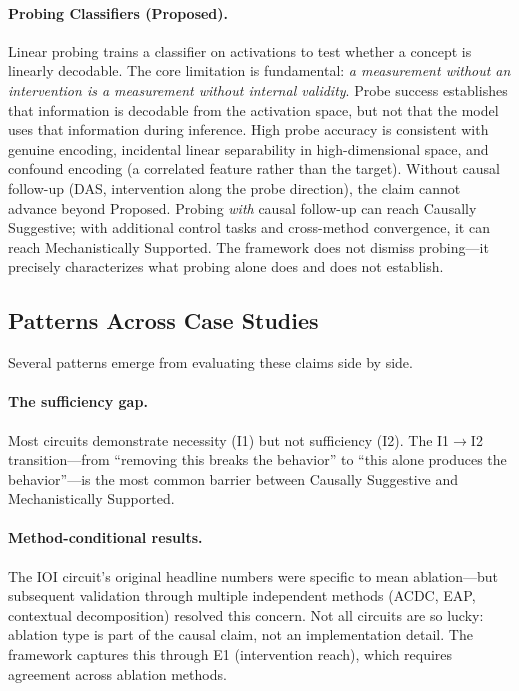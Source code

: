 \documentclass[10pt]{article}
\begin{document}
\paragraph{Probing Classifiers (Proposed).} Linear probing \citep{belinkov2022probing} trains a classifier on activations to test whether a concept is linearly decodable. The core limitation is fundamental: \emph{a measurement without an intervention is a measurement without internal validity}. Probe success establishes that information is decodable from the activation space, but not that the model uses that information during inference. High probe accuracy is consistent with genuine encoding, incidental linear separability in high-dimensional space, and confound encoding (a correlated feature rather than the target). Without causal follow-up (DAS, intervention along the probe direction), the claim cannot advance beyond Proposed. Probing \emph{with} causal follow-up can reach Causally Suggestive; with additional control tasks and cross-method convergence, it can reach Mechanistically Supported. The framework does not dismiss probing---it precisely characterizes what probing alone does and does not establish.

\subsection{Patterns Across Case Studies}

Several patterns emerge from evaluating these claims side by side.

\paragraph{The sufficiency gap.} Most circuits demonstrate necessity (I1) but not sufficiency (I2). The I1$\rightarrow$I2 transition---from ``removing this breaks the behavior'' to ``this alone produces the behavior''---is the most common barrier between Causally Suggestive and Mechanistically Supported.

\paragraph{Method-conditional results.} The IOI circuit's original headline numbers were specific to mean ablation---but subsequent validation through multiple independent methods (ACDC, EAP, contextual decomposition) resolved this concern. Not all circuits are so lucky: ablation type is part of the causal claim, not an implementation detail. The framework captures this through E1 (intervention reach), which requires agreement across ablation methods.
\end{document}
